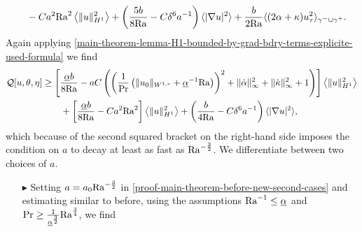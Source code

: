 \documentclass{article}
\theoremstyle{definition}
\theoremstyle{definition}
\newcommand{\Pra}{\rm{Pr}}
\newcommand{\Ra}{{\rm{Ra}}}
\begin{document}
\begin{itemize}
\begin{align*}
            \\
            &\qquad - C a^2 \Ra^2 \left\langle\|u\|_{H^1}^2\right\rangle + \left(\frac{5b}{8\Ra}-C\delta^6 a^{-1}\right) \langle |\nabla u|^2\rangle + \frac{b}{2\Ra}\langle (2\alpha+\kappa)u_\tau^2\rangle_{\gamma^-\cup\gamma^+}.        
        \end{align*}
        Again applying \eqref{main-theorem-lemma-H1-bounded-by-grad-bdry-terms-explicite-used-formula} we find
        \begin{equation}
            \label{proof-main-theorem-before-new-second-cases}
            \begin{aligned}
                \mathcal{Q}[u,\theta,\eta] &\geq \left[\frac{\underline{\alpha} b}{8\Ra} - a C\left(\left(\frac{1}{\Pra}\left(\|u_0\|_{W^{1,r}} +\underline{\alpha}^{-1}\Ra\right)\right)^2+\|\dot\alpha\|_\infty^2+\|\dot\kappa\|_\infty^2+1\right) \right]\left\langle\|u\|_{H^1}^2\right\rangle
                \\
                &\qquad + \left[\frac{\underline{\alpha}b}{8\Ra}  - C a^2 \Ra^2\right] \left\langle\|u\|_{H^1}^2\right\rangle + \left(\frac{b}{4\Ra}-C\delta^6 a^{-1}\right) \langle |\nabla u|^2\rangle,
            \end{aligned}
        \end{equation}
        which because of the second squared bracket on the right-hand side imposes the condition on $a$ to decay at least as fast as $\Ra^{-\frac{3}{2}}$. We differentiate between two choices of $a$.
        \begin{itemize}
            \item[\small{$\blacktriangleright$}] 
                Setting $a=a_0\Ra^{-\frac{3}{2}}$ in \eqref{proof-main-theorem-before-new-second-cases} and estimating similar to before, using the assumptions $\Ra^{-1}\leq \underline{\alpha}$ and $\Pra\geq \frac{1}{\underline{\alpha}^\frac{3}{2}}\Ra^\frac{3}{4}$, we find

\end{itemize}
\end{itemize}
\end{document}
